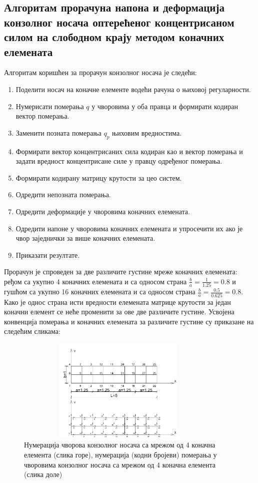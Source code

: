 \documentclass[11pt, a4paper]{article}
\begin{document}
\subsection{Алгоритам прорачуна напона и деформација конзолног носача оптерећеног концентрисаном силом на слободном крају методом коначних елемената}
Алгоритам коришћен за прорачун конзолног носача је следећи:
\begin{enumerate}
\item Поделити носач на коначне елементе водећи рачуна о њиховој регуларности. 
\item Нумерисати померања $q$ у чворовима у оба правца и формирати кодиран вектор померања.
\item Заменити позната померања $q_p$ њиховим вредностима.
\item Формирати вектор концентрисаних сила кодиран као и вектор померања и задати вредност концентрисане силе у правцу одређеног померања.
\item Формирати кодирану матрицу крутости за цео систем.
\item Одредити непозната померања.
\item Одредити деформације у чворовима коначних елемената.
\item Одредити напоне у чворовима коначних елемената и упросечити их ако је чвор заједнички за више коначних елемената.
\item Приказати резултате.
\end{enumerate}
Прорачун је спроведен за две различите густине мреже коначних елемената: ређом са укупно 4 коначних елемената и са односом страна $\frac{b}{a}= \frac{1}{1.25} = 0.8$ и гушћом са укупно 16 коначних елемената и са односом страна $\frac{b}{a}= \frac{0.5}{0.625} = 0.8$. Како је однос страна исти вредности елемената матрице крутости за један коначни елемент се неће променити за ове две различите густине. Усвојена конвенција померања и коначних елемената за различите густине су приказане на следећим сликама:
\begin{figure}[H]
\centering
\includegraphics[width=10cm, height=5cm]{Slike/Redja.png}
\caption{Нумерација чворова конзолног носача са мрежом од 4 коначна елемента (слика горе), нумерација (кодни бројеви) померања у чворовима конзолног носача са мрежом од 4 коначна елемента (слика доле)}
\end{figure}
\end{document}

